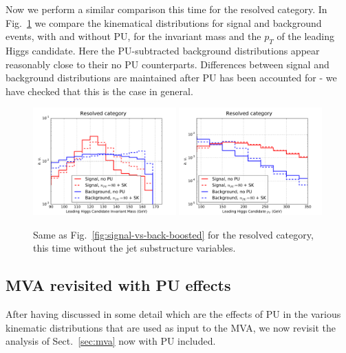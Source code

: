 Now we perform a similar comparison this time for
the resolved category.
%
In Fig.~\ref{fig:signal-vs-back-resolved} we compare
the kinematical distributions for signal and background events,
     with and without PU, for the invariant mass and the $p_T$ of the leading
     Higgs candidate.
     Here the PU-subtracted background distributions appear reasonably close
     to their no PU counterparts.
     Differences between signal and background distributions are maintained after PU
     has been accounted for - we have checked that this is the case
     in general.


\begin{figure}[t]
  \begin{center}
    \vspace{-1cm}
  \includegraphics[width=0.49\textwidth]{plots/m_h0_res_comp_back.pdf}
  \includegraphics[width=0.49\textwidth]{plots/pt_h0_res_comp_back.pdf}
     \caption{\small
       Same as Fig.~\ref{fig:signal-vs-back-boosted} for the resolved category,
       this time without the jet substructure variables.
}
\label{fig:signal-vs-back-resolved}
\end{center}
\end{figure}


\subsection{MVA revisited with PU effects}

After having discussed in some detail which are the effects
of PU in the various kinematic distributions that are used
as input to the MVA, we now revisit the analysis
of Sect.~\ref{sec:mva} now with PU included.


